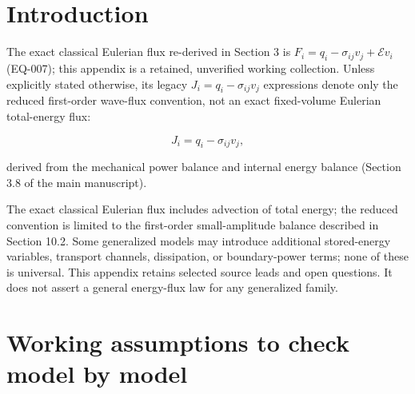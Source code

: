 %

\section{Introduction}

The exact classical Eulerian flux re-derived in Section 3 is $F_i=q_i-\sigma_{ij}v_j+\mathcal{E}v_i$ (EQ-007); this appendix is a retained, unverified working collection. Unless explicitly stated otherwise, its legacy $J_i=q_i-\sigma_{ij}v_j$ expressions denote only the reduced first-order wave-flux convention, not an exact fixed-volume Eulerian total-energy flux:

\begin{equation}
J_i = q_i - \sigma_{ij}v_j,
\label{ef:classical}
\end{equation}

derived from the mechanical power balance and internal energy balance (Section 3.8 of the main manuscript).

The exact classical Eulerian flux includes advection of total energy; the reduced convention is limited to the first-order small-amplitude balance described in Section 10.2. Some generalized models may introduce additional stored-energy variables, transport channels, dissipation, or boundary-power terms; none of these is universal. This appendix retains selected source leads and open questions. It does not assert a general energy-flux law for any generalized family.

\section{Working assumptions to check model by model}

